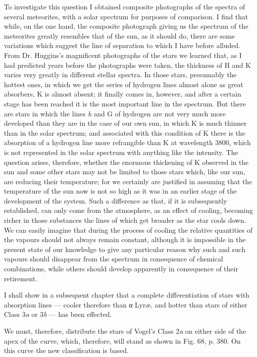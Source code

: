 \documentclass[a4paper, 12pt, oneside, polutonikogreek, english]{article}
\begin{document}
To investigate this question I obtained composite photographs of the spectra of several meteorites, with a solar spectrum for purposes of comparison. I find that while, on the one hand, the composite photograph giving us the spectrum of the meteorites greatly resembles that of the sun, as it should do, there are some variations which suggest the line of separation to which I have before alluded. From Dr. Huggins's magnificent photographs of the stars we learned that, as I had predicted years before the photographs were taken, the thickness of H and K varies very greatly in different stellar spectra. In those stars, presumably the hottest ones, in which we get the series of hydrogen lines almost alone as great absorbers, K is almost absent; it finally comes in, however, and after a certain stage has been reached it is the most important line in the spectrum. But there are stars in which the lines \emph{h} and G of hydrogen are not very much more developed than they are in the case of our own sun, in which K is much thinner than in the solar spectrum; and associated with this condition of K there is the absorption of a hydrogen line more refrangible than K at wavelength 3800, which is not represented in the solar spectrum with anything like the intensity. The question arises, therefore, whether the enormous thickening of K observed in the sun and some other stars may not be limited to those stars which, like our sun, are reducing their temperature; for we certainly are justified in assuming that the temperature of the sun now is not so high as it was in an earlier stage of the development of the system. Such a difference as that, if it is subsequently established, can only come from the atmosphere, as an effect of cooling, becoming richer in those substances the lines of which get broader as the star cools down. We can easily imagine that during the process of cooling the relative quantities of the vapours should not always remain constant, although it is impossible in the present state of our knowledge to give any particular reason why such and such vapours should disappear from the spectrum in consequence of chemical combinations, while others should develop apparently in consequence of their retirement.

I shall show in a subsequent chapter that a complete differentiation of stars with absorption lines --- cooler therefore than α Lyræ, and hotter than stars of either Class 3\emph{a} or 3\emph{b} --- has been effected.

We must, therefore, distribute the stars of Vogel's Class 2\emph{a} on either side of the apex of the curve, which, therefore, will stand as shown in Fig. 68, p. 380. On this curve the new classification is based.
\end{document}
